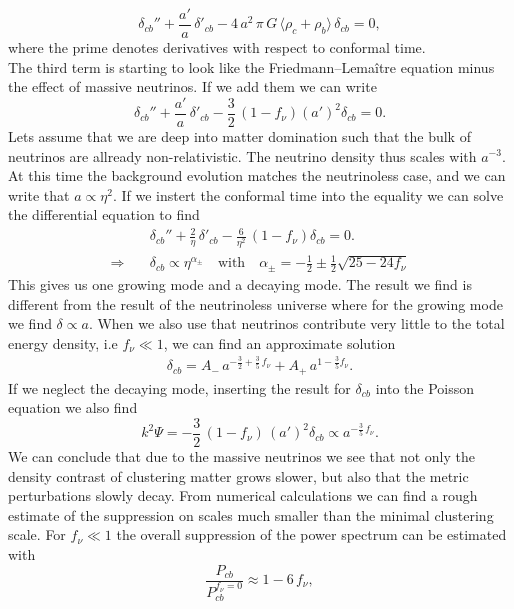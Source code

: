 \documentclass[oneside]{book}
\begin{document}
\begin{equation}
    \delta_{cb}'' + \frac{a'}{a}\,\delta'_{cb} - 4\,a^2\,\pi\,G\,\langle \rho_c + \rho_b \rangle\, \delta_{cb} = 0,
\end{equation} 
where the prime denotes derivatives with respect to conformal time.\\
The third term is starting to look like the Friedmann–Lemaître equation minus the effect of massive neutrinos. If we add them we can write 
\begin{equation}
    \delta_{cb}'' + \frac{a'}{a}\,\delta'_{cb} - \frac{3}{2}\,(1-f_\nu)\left({a'}\right)^2 \delta_{cb} = 0.
\end{equation}
Lets assume that we are deep into matter domination such that the bulk of neutrinos are allready non-relativistic. The neutrino density thus scales with $a^{-3}$. At this time the background evolution matches the neutrinoless case, and we can write that $a\propto\eta^2$. If we instert the conformal time into the equality we can solve the differential equation to find \begin{align}
    &\delta_{cb}'' + \frac{2}{\eta}\,\delta'_{cb} - \frac{6}{\eta^2}\,(1-f_\nu) \delta_{cb} = 0.\\
    \Longrightarrow\quad&\delta_{cb} \propto \eta^{\alpha_\pm}\quad\text{with}\quad\alpha_\pm = -\frac{1}{2}\pm\frac{1}{2}\sqrt{25-24f_\nu}
\end{align}
This gives us one growing mode and a decaying mode. The result we find is different from the result of the neutrinoless universe where for the growing mode we find $\delta\propto a$. When we also use that neutrinos contribute very little to the total energy density, i.e $f_\nu\ll 1$, we can find an approximate solution \begin{align}
    \delta_{cb} = A_-\,a^{-\frac{3}{2}+\frac{3}{5}\,f_\nu}+A_+\, a^{1-\frac{3}{5}f_\nu}.
\end{align}
If we neglect the decaying mode, inserting the result for $\delta_{cb}$ into the Poisson equation we also find 
\begin{equation}
k^2\Psi = -\frac{3}{2}\,(1-f_\nu)\,(a')^2\delta_{cb}\propto a^{-\frac{3}{5}\,f_\nu}.
\end{equation}
We can conclude that due to the massive neutrinos we see that not only the density contrast of clustering matter grows slower, but also that the metric perturbations slowly decay. From numerical calculations we can find a rough estimate of the suppression on  scales much smaller than the minimal clustering scale. For $f_\nu\ll1$ the overall suppression of the power spectrum  can be estimated with \begin{equation}
    \frac{P_{cb}}{P_{cb}^{f_\nu=0}} \approx 1- 6\,f_\nu,
\end{equation} 
\end{document}
